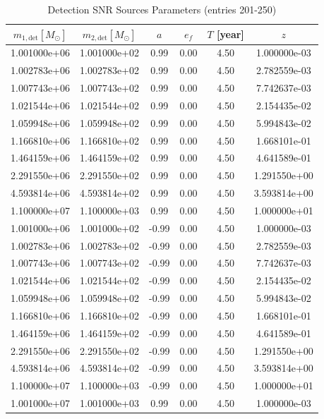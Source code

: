 \documentclass{article}
\begin{document}
\clearpage

\begin{table}[htbp]
\centering
\caption{Detection SNR Sources Parameters (entries 201-250)}
\label{tab:snr_sources_5}
\begin{tabular}{cccccc}
\hline
$m_{1,\mathrm{det}} [M_\odot]$ & $m_{2,\mathrm{det}} [M_\odot]$ & $a$ & $e_f$ & $T$ [year] & $z$ \\
\hline
1.001000e+06 & 1.001000e+02 & 0.99 & 0.00 & 4.50 & 1.000000e-03 \\
1.002783e+06 & 1.002783e+02 & 0.99 & 0.00 & 4.50 & 2.782559e-03 \\
1.007743e+06 & 1.007743e+02 & 0.99 & 0.00 & 4.50 & 7.742637e-03 \\
1.021544e+06 & 1.021544e+02 & 0.99 & 0.00 & 4.50 & 2.154435e-02 \\
1.059948e+06 & 1.059948e+02 & 0.99 & 0.00 & 4.50 & 5.994843e-02 \\
1.166810e+06 & 1.166810e+02 & 0.99 & 0.00 & 4.50 & 1.668101e-01 \\
1.464159e+06 & 1.464159e+02 & 0.99 & 0.00 & 4.50 & 4.641589e-01 \\
2.291550e+06 & 2.291550e+02 & 0.99 & 0.00 & 4.50 & 1.291550e+00 \\
4.593814e+06 & 4.593814e+02 & 0.99 & 0.00 & 4.50 & 3.593814e+00 \\
1.100000e+07 & 1.100000e+03 & 0.99 & 0.00 & 4.50 & 1.000000e+01 \\
1.001000e+06 & 1.001000e+02 & -0.99 & 0.00 & 4.50 & 1.000000e-03 \\
1.002783e+06 & 1.002783e+02 & -0.99 & 0.00 & 4.50 & 2.782559e-03 \\
1.007743e+06 & 1.007743e+02 & -0.99 & 0.00 & 4.50 & 7.742637e-03 \\
1.021544e+06 & 1.021544e+02 & -0.99 & 0.00 & 4.50 & 2.154435e-02 \\
1.059948e+06 & 1.059948e+02 & -0.99 & 0.00 & 4.50 & 5.994843e-02 \\
1.166810e+06 & 1.166810e+02 & -0.99 & 0.00 & 4.50 & 1.668101e-01 \\
1.464159e+06 & 1.464159e+02 & -0.99 & 0.00 & 4.50 & 4.641589e-01 \\
2.291550e+06 & 2.291550e+02 & -0.99 & 0.00 & 4.50 & 1.291550e+00 \\
4.593814e+06 & 4.593814e+02 & -0.99 & 0.00 & 4.50 & 3.593814e+00 \\
1.100000e+07 & 1.100000e+03 & -0.99 & 0.00 & 4.50 & 1.000000e+01 \\
1.001000e+07 & 1.001000e+03 & 0.99 & 0.00 & 4.50 & 1.000000e-03 \\

\end{tabular}
\end{table}
\end{document}

